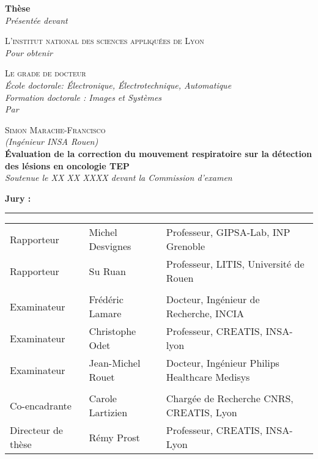 \begin{titlepage}

\begin{center}



\textbf{\Large Thèse}\\[0.5cm]

\textsl{\large Présentée devant}

\textsc{\large L’institut national des sciences appliquées de Lyon}\\[1.5cm]

\textsl{\large Pour obtenir}

\textsc{\large Le grade de docteur}\\[1.5cm]

\textsl{\large École doctorale: \'Electronique, \'Electrotechnique, Automatique}\\%
\textsl{\large Formation doctorale : Images et Systèmes}\\[1cm]
\textsl{\large Par}

\textsc{\large Simon Marache-Francisco}\\\textsl{(Ingénieur INSA Rouen)}\\[1.5cm]

\textbf{\LARGE \'Evaluation de la correction du mouvement respiratoire sur la détection des lésions en oncologie TEP}\\[1.5cm]

\textsl{\large Soutenue le XX XX XXXX devant la Commission d’examen}\\[1cm]

\vfill 

\begin{flushleft} \textbf{\Large Jury :} \end{flushleft}

\rule{\linewidth}{0.2 em}

\begin{tabular}{l l l}
Rapporteur 	& Michel Desvignes	&	Professeur, GIPSA-Lab, INP Grenoble\\
Rapporteur 	& Su Ruan		&	Professeur, LITIS, Université de Rouen\\
\\
Examinateur	& Frédéric Lamare	&	Docteur, Ingénieur de Recherche, INCIA\\
Examinateur	& Christophe Odet	&	Professeur, CREATIS, INSA-lyon\\
Examinateur	& Jean-Michel Rouet	&	Docteur, Ingénieur Philips Healthcare Medisys\\
\\
Co-encadrante	& Carole Lartizien	&	Chargée de Recherche CNRS, CREATIS, Lyon\\
Directeur de thèse& Rémy Prost		&	Professeur, CREATIS, INSA-Lyon\\





\end{tabular}
\end{center}
\end{titlepage}
